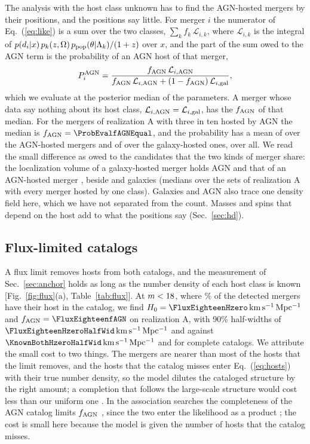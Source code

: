\documentclass[aps,prd,reprint,twocolumn,superscriptaddress,nofootinbib,floatfix,nolongbibliography]{revtex4-2}
\newcommand{\kms}{{\rm km\,s^{-1}\,Mpc^{-1}}}
\newcommand{\Lcal}{\mathcal{L}}
\newcommand{\fagn}{f_{\rm AGN}}
\begin{document}
The analysis with the host class unknown has to find the AGN-hosted mergers
by their positions, and the positions say little. For merger $i$ the
numerator of Eq.~(\ref{eq:like}) is a sum over the two classes, $\sum_k
f_k\,\Lcal_{i,k}$, where $\Lcal_{i,k}$ is the integral of
$p(d_i|x)\,p_k(z,\Omega)\,p_{\rm pop}(\theta|\Lambda_k)/(1+z)$ over $x$, and
the part of the sum owed to the AGN term is the probability of an AGN host
of that merger,
\begin{equation}
P^{\rm AGN}_i=\frac{\fagn\,\Lcal_{i,{\rm AGN}}}
{\fagn\,\Lcal_{i,{\rm AGN}}+(1-\fagn)\,\Lcal_{i,{\rm gal}}} ,
\label{eq:phost}
\end{equation}
which we evaluate at the posterior median of the parameters. A merger whose
data say nothing about its host class, $\Lcal_{i,{\rm AGN}}=\Lcal_{i,{\rm
gal}}$, has the $\fagn$ of that median. For the mergers of realization A
with three in ten hosted by AGN the median is $\fagn=\ProbEvalfAGNEqual$,
and the probability has a mean of \ProbAGNEqual{} over the AGN-hosted
mergers and of \ProbGalEqual{} over the galaxy-hosted ones, \ProbAllEqual{}
over all. We read the small difference as owed to the candidates that the
two kinds of merger share: the localization volume of a galaxy-hosted merger
holds \PureAGNHostsPerVolGalEvents{} AGN and that of an AGN-hosted merger
\PureAGNHostsPerVol, beside \PureGalHostsPerVol{} and
\PureGalHostsPerVolAGNEvents{} galaxies (medians over the sets of
realization A with every merger hosted by one class). Galaxies and AGN also
trace one density field here, which we have not separated from the count.
Masses and spins that depend on the host add to what the positions say
(Sec.~\ref{sec:hd}).

\subsection{Flux-limited catalogs}
\label{sec:flux}

A flux limit removes hosts from both catalogs, and the measurement of
Sec.~\ref{sec:anchor} holds as long as the number density of each host class
is known [Fig.~\ref{fig:flux}(a), Table~\ref{tab:flux}].
At $m<18$, where \MockEventCompEighteen\% of the detected
mergers have their host in the catalog, we find
$H_0=\FluxEighteenHzero\,\kms$ and $\fagn=\FluxEighteenfAGN$ on realization
A, with 90\% half-widths of $\FluxEighteenHzeroHalfWid\,\kms$ and
\FluxEighteenfAGNHalfWid{} against $\KnownBothHzeroHalfWid\,\kms$ and
\KnownBothfAGNHalfWid{} for complete catalogs. We attribute the small cost to
two things.
The mergers are nearer than most of the hosts that the limit removes, and
the hosts that the catalog misses enter Eq.~(\ref{eq:hosts}) with their true
number density, so the model dilutes the cataloged structure by the right
amount; a completion that follows the large-scale structure would cost
less than our uniform one \cite{Dalang:2023ehp,Barbieri:2026fdy}. In the
association searches the completeness of the AGN catalog limits $\fagn$
\cite{Pouw:2026lar}, since the two enter the likelihood as a product
\cite{Veronesi:2023ugk,Veronesi:2024tef,Zhu:2025rdv}; the cost
is small here because the model is given the number of hosts that the
catalog misses.
\end{document}
